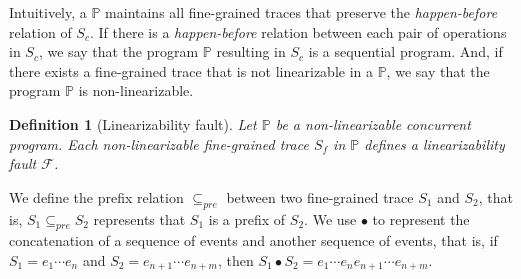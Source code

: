 \documentclass[runningheads]{llncs}
\newcommand{\p}{\mathbb{P} }
\newtheorem{myDef}{Definition}
\begin{document}
Intuitively, a $\mathbb{P}$ maintains all %
fine-grained traces that preserve the \textit{happen-before} relation of $S_c$.
If there is a \textit{happen-before} relation between each pair of operations in $S_c$, we say that the program $\p$ resulting in $S_c$ is a sequential program.
And, if there exists a fine-grained trace that is not linearizable in a $\p$, we say that the program $\p$ is non-linearizable.

\begin{myDef}[Linearizability fault]
Let $\p$ be a non-linearizable concurrent program. Each non-linearizable fine-grained trace $S_f$ in $\p$ defines a \textit{linearizability fault} $\mathcal{F}$.
\end{myDef}

We define the prefix relation $\subseteq_{pre}$ between two fine-grained trace $S_1$ and $S_2$, that is, $S_1\subseteq_{pre} S_2$ represents that $S_1$ is a prefix of $S_2$. We use $\bullet$ to represent the concatenation of a sequence of events and another sequence of events, that is, if $S_1=e_1\cdots e_n$ and $S_2 = e_{n+1}\cdots e_{n+m}$, then $S_1\bullet S_2 = e_1\cdots e_n e_{n+1}\cdots e_{n+m}$.
\end{document}
